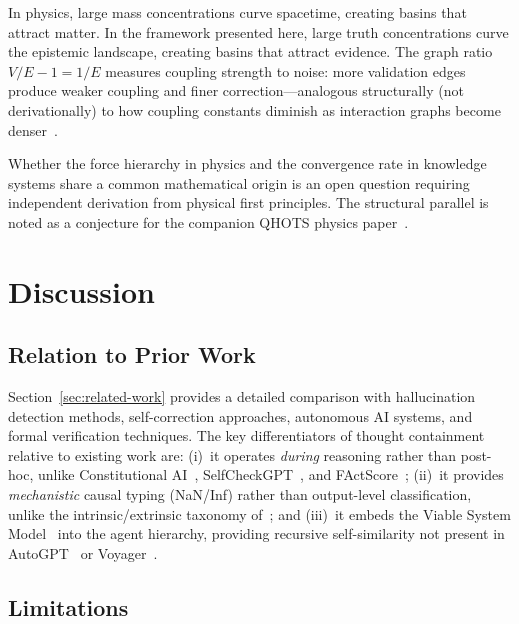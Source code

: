 \documentclass[11pt]{article}
\theoremstyle{definition}
\theoremstyle{remark}
\begin{document}
In physics, large mass concentrations curve spacetime, creating basins that
attract matter.  In the framework presented here, large truth concentrations
curve the epistemic landscape, creating basins that attract evidence.  The graph
ratio $V/E - 1 = 1/E$ measures coupling strength to noise: more validation edges
produce weaker coupling and finer correction---analogous structurally (not
derivationally) to how coupling constants diminish as interaction graphs become
denser~\cite{wilson1975rg}.

Whether the force hierarchy in physics and the convergence rate in knowledge
systems share a common mathematical origin is an open question requiring
independent derivation from physical first principles.  The structural parallel
is noted as a conjecture for the companion QHOTS physics paper~\cite{qhots2026}.

\section{Discussion}
\label{sec:discussion}

\subsection{Relation to Prior Work}
\label{sec:prior-work}

Section~\ref{sec:related-work} provides a detailed comparison with
hallucination detection methods, self-correction approaches, autonomous AI
systems, and formal verification techniques.  The key differentiators of
thought containment relative to existing work are: (i)~it operates
\emph{during} reasoning rather than post-hoc, unlike Constitutional
AI~\cite{bai2022constitutional}, SelfCheckGPT~\cite{manakul2023selfcheckgpt},
and FActScore~\cite{min2023factscore}; (ii)~it provides \emph{mechanistic}
causal typing (NaN/Inf) rather than output-level classification, unlike the
intrinsic/extrinsic taxonomy of~\cite{ji2023survey}; and (iii)~it embeds
the Viable System Model~\cite{beer1972,beer1979} into the agent hierarchy,
providing recursive self-similarity not present in
AutoGPT~\cite{yang2023autogpt} or Voyager~\cite{wang2023voyager}.

\subsection{Limitations}
\label{sec:limitations}
\end{document}
